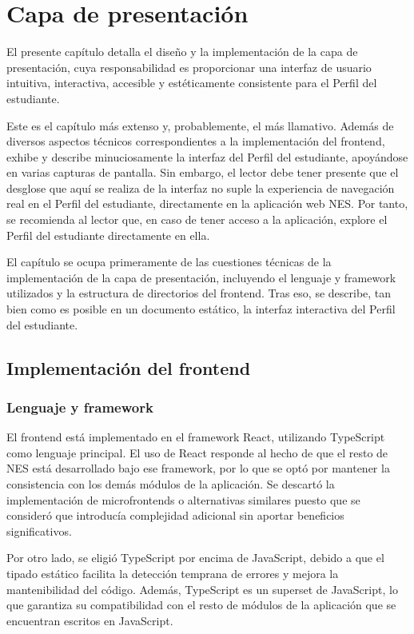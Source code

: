 \chapter{Capa de presentación}
\label{ch:presentacion}

El presente capítulo detalla el diseño y la implementación de la capa de presentación, cuya responsabilidad es proporcionar una interfaz de usuario intuitiva, interactiva, accesible y estéticamente consistente para el Perfil del estudiante.

Este es el capítulo más extenso y, probablemente, el más llamativo. Además de diversos aspectos técnicos correspondientes a la implementación del \gls{frontend}, exhibe y describe minuciosamente la interfaz del Perfil del estudiante, apoyándose en varias capturas de pantalla. Sin embargo, el lector debe tener presente que el desglose que aquí se realiza de la interfaz no suple la experiencia de navegación real en el Perfil del estudiante, directamente en la aplicación web \gls{NES}. Por tanto, se recomienda al lector que, en caso de tener acceso a la aplicación, explore el Perfil del estudiante directamente en ella.

El capítulo se ocupa primeramente de las cuestiones técnicas de la implementación de la capa de presentación, incluyendo el lenguaje y framework utilizados y la estructura de directorios del frontend. Tras eso, se describe, tan bien como es posible en un documento estático, la interfaz interactiva del Perfil del estudiante.

\section{Implementación del frontend}

\subsection{Lenguaje y framework}

El frontend está implementado en el framework \gls{React}, utilizando \gls{TypeScript} como lenguaje principal. El uso de React responde al hecho de que el resto de \gls{NES} está desarrollado bajo ese framework, por lo que se optó por mantener la consistencia con los demás módulos de la aplicación. Se descartó la implementación de microfrontends o alternativas similares puesto que se consideró que introducía complejidad adicional sin aportar beneficios significativos.

Por otro lado, se eligió \gls{TypeScript} por encima de \gls{JavaScript}, debido a que el tipado estático facilita la detección temprana de errores y mejora la mantenibilidad del código. Además, \gls{TypeScript} es un superset de \gls{JavaScript}, lo que garantiza su compatibilidad con el resto de módulos de la aplicación que se encuentran escritos en \gls{JavaScript}.

